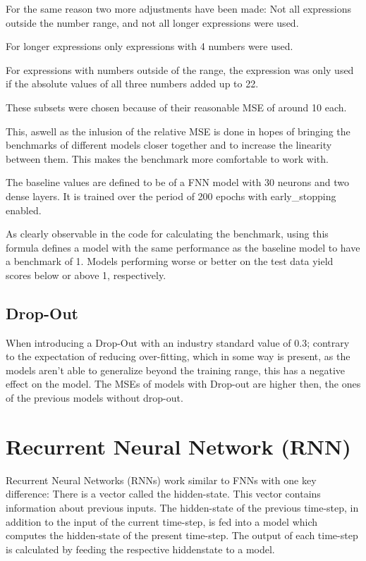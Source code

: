 \documentclass{article}
\begin{document}
For the same reason two more adjustments have been made:
Not all expressions outside the number range, and not all longer expressions 
were used. 

For longer expressions only expressions with 4 numbers were used.

For expressions with numbers outside of the range, the expression was only 
used if the absolute values of all three numbers added up to 22.

These subsets were chosen because of their reasonable MSE of around 10 each.

This, aswell as the inlusion of the relative MSE is done in hopes of 
bringing the benchmarks of different models closer together and to increase 
the linearity between them. This makes the benchmark more comfortable to 
work with.

The baseline values are defined to be of a FNN model with 30 neurons and two 
dense layers. It is trained over the period of 200 epochs with 
early\_stopping enabled.

As clearly observable in the code for calculating the benchmark, using this 
formula defines a model with the same performance as the baseline model to 
have a benchmark of 1. Models performing worse or better on the test data 
yield scores below or above 1, respectively.


\subsection{Drop-Out}
When introducing a Drop-Out with an industry standard value of 0.3; contrary 
to the expectation of reducing over-fitting, which in some way is present, 
as the models aren't able to generalize beyond the training range, this has 
a negative effect on the model. The MSEs of models with Drop-out are higher 
then, the ones of the previous models without drop-out.

\section{Recurrent Neural Network (RNN)}
Recurrent Neural Networks (RNNs) work similar to FNNs with one key 
difference: There is a vector called the hidden-state. This vector contains 
information about previous inputs. The hidden-state of the previous 
time-step, in addition to the input of the current time-step, is fed into a 
model which computes the hidden-state of the present time-step. The output 
of each time-step is calculated by feeding the respective hiddenstate to a 
model.
\end{document}
